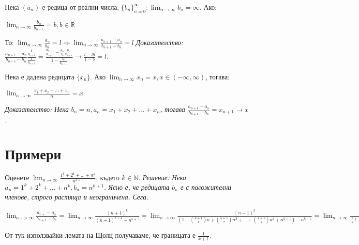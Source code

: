 \documentclass[12pt]{article}
\begin{document}
\begin{theorem}

Нека \((a_n)\) е редица от реални числа, \(\displaystyle\{b_n\}_{n=0}^\infty: \lim_{n \to \infty} b_n = \infty\). Ако:
\begin{center}
\(
    \displaystyle\lim_{n \to \infty}\frac{b_n}{b_{n+1}} = b, b \in \mathbb R 
\)
\end{center}
То: \(\displaystyle\lim_{n \to \infty}\frac{a_n}{b_n} = l \Rightarrow \lim_{n \to \infty}\frac{a_{n+1} - a_n}{b_{n+1} - b_n} = l \)
\newline
\it{Доказателство:}
\(
    \displaystyle\frac{a_{n + 1} - a_n}{b_{n+1} - b_n} \frac{\frac{1}{b_{n+1}}}{\frac{1}{b_{n+1}}} = \frac{\frac{a_{n+1}}{b_{n+1}} - \frac{a_n}{b_n}\frac{b_n}{b_{n+1}}}{1 - \frac{b_n}{b_{n+1}}}
    \to
    \frac{l - lb}{1 - b} = l.
\)
\end{theorem}

\begin{theorem}
Нека е дадена редицата \(\{x_n\}\). Ако \(\displaystyle\lim_{n \to \infty} x_n = x, x \in (-\infty, \infty)\), тогава:
\begin{center}
\(
    \displaystyle\lim_{n \to \infty} \frac{x_1 + x_2 + ... + x_n}{n} = x
\)
\end{center}
\it{Доказателство:} Нека \(b_n = n, a_n = x_1 + x_2 + ... + x_n\), тогава \(\displaystyle\frac{a_{n+1} - a_n}{b_{n+1} - b_n} = x_{n+1} \to x\).
\end{theorem}

\newpage
\section{Примери}

\begin{example}
Оценете \(\displaystyle\lim_{n \to \infty} \frac{1^k + 2^k + ... + n^k}{n^{k+1}}\), където \(k \in \mathbb N\).
\newline
\it{Решение:} Нека \(a_n = 1^k + 2^k + ... + n^k, b_n = n^{k+1}\). Ясно е, че редицата \(b_n\) е с положителни членове, строго растяща и неограничена. Сега:
\begin{center}
\(
    \displaystyle\lim_{n->\infty}\frac{a_{n+} - a_n}{b_{n+1} - b_n} = \lim_{n \to \infty}\frac{(n + 1)^k}{(n + 1)^{k+1} - n^{k+1}} = 
    \lim_{n \to \infty}\frac{(n + 1)^k}{(1 + \binom{k+1}{1}n + \binom{k + 1}{2}n^2+ ... + \binom{k + 1}{k}n^k + n^{k + 1}) - n^{k + 1}} = 
    \lim_{n \to \infty}\frac{(n + 1)^k/n^k}{(1 + \binom{k + 1}{1}n + \binom{k + 1}{2}n^2 + ... + \binom{k + 1}{k}n^k)/n^k} =
    \lim_{n \to \infty}\frac{(1 + 1 / n)^k}{\binom{k + 1}{k}} = \frac{1}{k + 1}.
\)
\end{center}
От тук използвайки лемата на Щолц получаваме, че границата е \(\frac{1}{k + 1}\).
\end{example}
\end{document}
